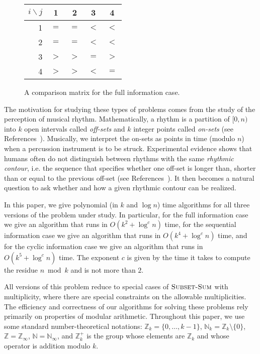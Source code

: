 \documentclass[11pt,a4paper]{article}
\newcommand{\Z}{\mathbb{Z}}
\newcommand{\N}{\mathbb{N}}
\newcommand{\defeq}{=}
\begin{document}
\begin{figure}
\begin{center}
\begin{tabular}{r|cccc}
$i\backslash j$ & 1 & 2 & 3 & 4 \\ \hline
1 & $=$ & $=$ & $<$ & $<$ \\
2 & $=$ & $=$ & $<$ & $<$ \\
3 & $>$ & $>$ & $=$ & $>$ \\
4 & $>$ & $>$ & $<$ & $=$ \\
\end{tabular}
\end{center}
\caption{A comparison matrix for the full information case.}
\end{figure}

The motivation for studying these types of problems comes from the
study of the perception of musical rhythm.  Mathematically, a rhythm
is a partition  of $[0,n)$ into $k$ open intervals called
\emph{off-sets} and $k$ integer points called \emph{on-sets} (see
References~\cite{t02,t03a,t03b,dfgrt04,t04}).  Musically, we interpret
the on-sets as points in time (modulo $n$) when a percussion
instrument is to be struck.  Experimental evidence shows that humans
often do not distinguish between rhythms with the same \emph{rhythmic
contour}, i.e.  the sequence that specifies whether one off-set is
longer than, shorter than or equal to the previous off-set (see
References~\cite{d78,ftrkp04,l96,kcgv00}).  It then becomes a natural
question to ask whether and how a given rhythmic contour can be
realized.

In this paper, we give polynomial (in $k$ and $\log n$) time
algorithms for all three versions of the problem under study.  In
particular, for the full information case we give an algorithm that
runs in $O(k^2 + \log^cn)$ time, for the sequential information case
we give an algorithm that runs in $O(k^4+\log^c n)$ time, and for the
cyclic information case we give an algorithm that runs in
$O(k^5+\log^c n)$ time.  The exponent $c$ is given by the time it
takes to compute the residue $n\bmod k$ and is not more than $2$.

All versions of this problem reduce to special cases of
$\textsc{Subset-Sum}$ with multiplicity, where there are special
constraints on the allowable multiplicities.  The efficiency and
correctness of our algorithms for solving these problems rely
primarily on properties of modular arithmetic. Throughout this paper,
we use some standard number-theoretical notations: $\Z_k\defeq
\{0,\ldots,k-1\}$, $\N_k\defeq\Z_k\setminus\{0\}$,
$\Z\defeq\Z_\infty$, $\N\defeq\N_\infty$, and $\Z_k^+$ is the group
whose elements are $\Z_k$ and whose operator is addition modulo $k$.
\end{document}

